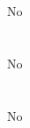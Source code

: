 \documentclass[fleqn]{article}
\begin{document}
\section{}
\begin{adjustwidth}{4em}{0pt}
	No \\	
\end{adjustwidth}

\section{}
\begin{adjustwidth}{4em}{0pt}
	No \\	
\end{adjustwidth}

\section{}
\begin{adjustwidth}{4em}{0pt}
	No \\	
\end{adjustwidth}
\end{document}
